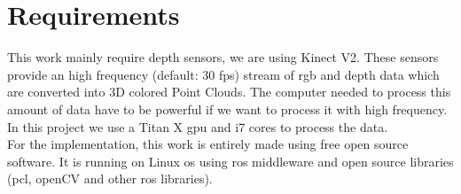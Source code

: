 \section*{Requirements}

This work mainly require depth sensors, we are using Kinect V2. These sensors provide an high frequency (default: 30 \acrshort{fps}) stream of \acrshort{rgb} and depth data which are converted into 3D colored Point Clouds. The computer needed to process this amount of data have to be powerful if we want to process it with high frequency. In this project we use a Titan X \acrshort{gpu} and i7 cores to process the data.\\
For the implementation, this work is entirely made using free \gls{open source} software. It is running on Linux \acrshort{os} using \acrshort{ros} \gls{middleware} and \gls{open source} \gls{libraries} (\acrshort{pcl}, openCV and other \acrshort{ros} libraries).